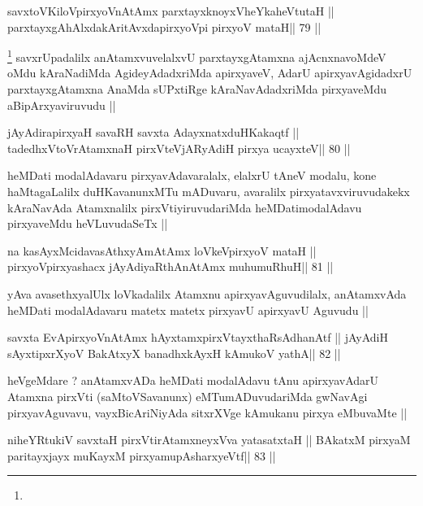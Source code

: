 \begin{shl}
savxtoV\s KiloV\s pirxyoV\s nAtAmx parxtayxknoyxVheYkaheVtutaH ||
parxtayxgAhAlxdakAritAvxdapirxyoV\s pi pirxyoV mataH\hfill || 79 ||
\end{shl}

\begin{artha}
\footnote[1]{}
savxrUpadalilx anAtamxvuvelalxvU parxtayxgAtamxna ajAcnxnavoMdeV oMdu
kAraNadiMda AgideyAdadxriMda apirxyaveV, AdarU apirxyavAgidadxrU
parxtayxgAtamxna AnaMda sUPxtiRge kAraNavAdadxriMda pirxyaveMdu
aBipArxyaviruvudu ||
\end{artha}

\begin{shl}
jAyAdirapirxyaH savaRH savxta AdayxnatxduHKakaqtf ||
tadedhxVtoVrAtamxnaH pirxVteVjARyAdiH pirxya ucayxteV\hfill || 80 ||
\end{shl}

\begin{artha}
heMDati modalAdavaru pirxyavAdavaralalx, elalxrU tAneV modalu, kone
haMtagaLalilx duHKavanunxMTu mADuvaru, avaralilx
pirxyatavxviruvudakekx kAraNavAda Atamxnalilx pirxVtiyiruvudariMda
heMDatimodalAdavu pirxyaveMdu heVLuvudaSeTx ||
\end{artha}

\begin{shl}
na kasAyxMcidavasAthxyAmAtAmx loVkeV\s pirxyoV mataH ||
pirxyoV\s pirxyashacx jAyAdiyaRthA\s nAtAmx muhumuRhuH\hfill || 81 ||
\end{shl}

\begin{artha}
yAva avasethxyalUlx loVkadalilx Atamxnu apirxyavAguvudilalx,
anAtamxvAda heMDati modalAdavaru matetx matetx pirxyavU apirxyavU
Aguvudu ||
\end{artha}

\begin{shl}
savxta EvApirxyoV\s nAtAmx hAyxtamxpirxVtayxthaRsAdhanAtf ||
jAyAdiH sAyxtipxrXyoV BakAtxyX banadhxkAyxH kAmukoV yathA\hfill || 82 ||
\end{shl}

\begin{artha}
heVgeMdare ? anAtamxvADa heMDati modalAdavu tAnu apirxyavAdarU Atamxna
pirxVti (saMtoVSavanunx) eMTumADuvudariMda gwNavAgi pirxyavAguvavu,
vayxBicAriNiyAda sitxrXVge kAmukanu pirxya eMbuvaMte ||
\end{artha}

\begin{shl}
niheYRtukiV savxtaH pirxVtirAtamxneyxVva yatasatxtaH ||
BAkatxM pirxyaM paritayxjayx muKayxM pirxyamupAsharxyeVtf\hfill || 83 ||
\end{shl}

